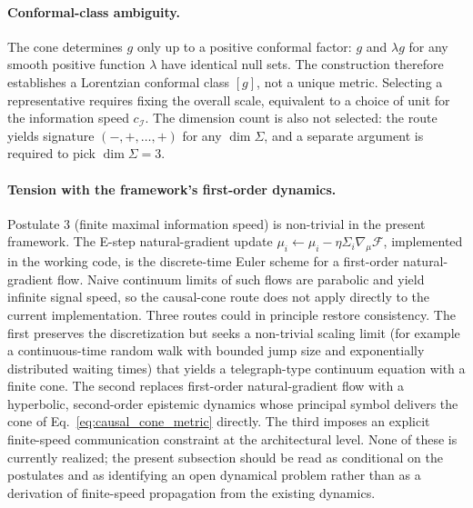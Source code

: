 \documentclass[11pt]{article}
\begin{document}
\paragraph{Conformal-class ambiguity.}
The cone determines $g$ only up to a positive conformal factor: $g$ and $\lambda g$ for any smooth positive function $\lambda$ have identical null sets. The construction therefore establishes a Lorentzian conformal class $[g]$, not a unique metric. Selecting a representative requires fixing the overall scale, equivalent to a choice of unit for the information speed $c_\mathcal{I}$. The dimension count is also not selected: the route yields signature $(-,+,\ldots,+)$ for any $\dim\Sigma$, and a separate argument is required to pick $\dim\Sigma = 3$.

\paragraph{Tension with the framework's first-order dynamics.}
Postulate 3 (finite maximal information speed) is non-trivial in the present framework. The E-step natural-gradient update $\mu_i \leftarrow \mu_i - \eta \Sigma_i \nabla_\mu\mathcal{F}$, implemented in the working code, is the discrete-time Euler scheme for a first-order natural-gradient flow. Naive continuum limits of such flows are parabolic and yield infinite signal speed, so the causal-cone route does not apply directly to the current implementation. Three routes could in principle restore consistency. The first preserves the discretization but seeks a non-trivial scaling limit (for example a continuous-time random walk with bounded jump size and exponentially distributed waiting times) that yields a telegraph-type continuum equation with a finite cone. The second replaces first-order natural-gradient flow with a hyperbolic, second-order epistemic dynamics whose principal symbol delivers the cone of Eq.~\eqref{eq:causal_cone_metric} directly. The third imposes an explicit finite-speed communication constraint at the architectural level. None of these is currently realized; the present subsection should be read as conditional on the postulates and as identifying an open dynamical problem rather than as a derivation of finite-speed propagation from the existing dynamics.
\end{document}
